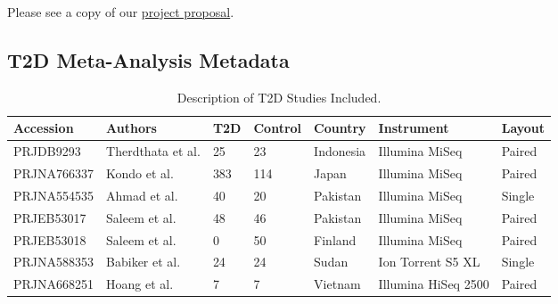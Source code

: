 \documentclass[12pt,letterpaper]{article}
\begin{document}

\clearpage
\makereference





\clearpage
\makeappendix

Please see a copy of our \href{https://drive.google.com/file/d/1fEGpmoSULPbpG6bcopPBKdlyF6gG_Gv_/view?usp=sharing}{project proposal}. 

\subsection{T2D Meta-Analysis Metadata}

      \begin{table}[H]
        \centering
        \begin{tabularx}{\textwidth}{l X X X X X X} %
          \toprule
          \textbf{Accession} & \textbf{Authors} & \textbf{T2D} & \textbf{Control} & \textbf{Country} & \textbf{Instrument} & \textbf{Layout} \\
          \midrule
          PRJDB9293 & Therdthata et al. & 25 & 23 & Indonesia & Illumina MiSeq & Paired \\
          PRJNA766337 & Kondo et al. & 383 & 114 & Japan & Illumina MiSeq & Paired \\
          PRJNA554535 & Ahmad et al. & 40 & 20 & Pakistan & Illumina MiSeq & Single \\
          PRJEB53017 & Saleem et al. &  48 & 46 & Pakistan & Illumina MiSeq & Paired \\
          PRJEB53018 & Saleem et al. & 0 & 50 & Finland & Illumina MiSeq & Paired \\
          PRJNA588353 & Babiker et al. & 24 & 24 & Sudan & Ion Torrent S5 XL & Single \\
          PRJNA668251 & Hoang et al. & 7 & 7 & Vietnam & Illumina HiSeq 2500 & Paired \\
          \bottomrule
        \end{tabularx}
        \caption{Description of T2D Studies Included.}
        \label{table:t2dmetameta}
      \end{table}
      
\end{document}
